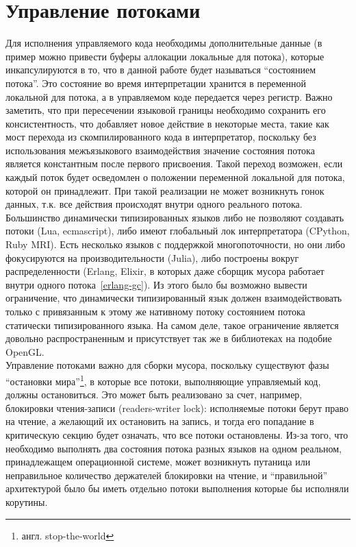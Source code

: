 \documentclass[times,specification,annotation]{itmo-student-thesis}
\begin{document}
\section{Управление потоками} \label{sec:thread-management}
Для исполнения управляемого кода необходимы дополнительные данные (в пример можно привести буферы аллокации локальные для потока), которые инкапсулируются в то, что в данной работе будет называться ``состоянием потока''. Это состояние во время интерпретации хранится в переменной локальной для потока, а в управляемом коде передается через регистр. Важно заметить, что при пересечении языковой границы необходимо сохранить его консистентность, что добавляет новое действие в некоторые места, такие как мост перехода из скомпилированного кода в интерпретатор, поскольку без использования межъязыкового взаимодействия значение состояния потока является константным после первого присвоения. Такой переход возможен, если каждый поток будет осведомлен о положении переменной локальной для потока, которой он принадлежит. При такой реализации не может возникнуть гонок данных, т.к. все действия происходят внутри одного реального потока.\\

Большинство динамически типизированных языков либо не позволяют создавать потоки (Lua, ecmascript), либо имеют глобальный лок интерпретатора (CPython, Ruby MRI). Есть несколько языков с поддержкой многопоточности, но они либо фокусируются на производительности (Julia), либо построены вокруг распределенности (Erlang, Elixir, в которых даже сборщик мусора работает внутри одного потока~\ref{erlang-gc}). Из этого было бы возможно вывести ограничение, что динамически типизированный язык должен взаимодействовать только с привязанным к этому же нативному потоку состоянием потока статически типизированного языка. На самом деле, такое ограничение является довольно распространенным и присутствует так же в библиотеках на подобие OpenGL.\\
Управление потоками важно для сборки мусора, поскольку существуют фазы ``остановки мира''\footnote{англ. stop-the-world}, в которые все потоки, выполняющие управляемый код, должны остановиться. Это может быть реализовано за счет, например, блокировки чтения-записи (readers-writer lock): исполняемые потоки берут право на чтение, а желающий их остановить на запись, и тогда его попадание в критическую секцию будет означать, что все потоки остановлены. Из-за того, что необходимо выполнять два состояния потока разных языков на одном реальном, принадлежащем операционной системе, может возникнуть путаница или неправильное количество держателей блокировки на чтение, и ``правильной'' архитектурой было бы иметь отдельно потоки выполнения которые бы исполняли корутины.
\end{document}
